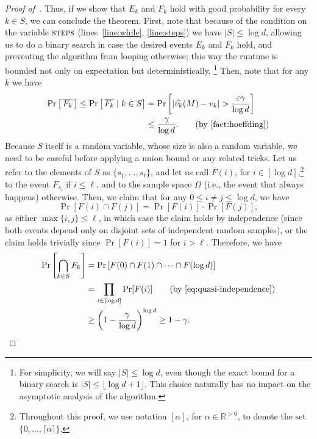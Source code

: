 \begin{proof}[Proof of~]
Thus, if we show that $E_k$ and $F_k$ hold with good probability for every $k \in S$, we can conclude the theorem.
First, note that because of the condition on the variable $\textsc{steps}$ (lines~\ref{line:while}, \ref{line:steps}) we have $|S| \leq \log d$, allowing us to do a binary search in case the desired events $E_k$ and $F_k$ hold, and preventing the algorithm from looping otherwise; this way the runtime is bounded not only on expectation but deterministically. \footnote{For simplicity, we will say $|S| \leq \log d$, even though the exact bound for a binary search is $|S| \leq \lfloor \log d  + 1 \rfloor$. This choice naturally has no impact on the asymptotic analysis of the algorithm.} Then, note that for any $k$ we have
\begin{align*}
	\Pr\left[ \, \overline{F_k} \,\right] \leq \Pr\left[ \, \overline{F_k} \mid k \in S \right] &= \Pr\left[|\widehat{v_k}(M) - v_k| > \frac{\varepsilon \gamma}{\log d}\right]\\
	&\leq \frac{\gamma}{\log d}. \tag{by~\Cref{fact:hoeffding}}
\end{align*}
Because $S$ itself is a random variable, whose size is also a random variable, we need to be careful before applying a union bound or any related tricks. Let us refer to the elements of $S$ as $\{s_1, \ldots, s_\ell\}$, and let us call $F(i)$, for $i \in [\log d]$,\footnote{Throughout this proof, we use notation $[\alpha]$, for $\alpha \in \mathbb{R}^{> 0}$, to denote the set $\{0, \ldots, \lceil \alpha \rceil\}$.} to the event $F_{s_i}$ if $i \leq \ell$, and to the sample space $\Omega$ (i.e., the event that always happens) otherwise. Then, we claim that for any $0 \leq i \neq j \leq \log d$, we have 
\begin{equation}\label{eq:quasi-independence}
	\Pr[F(i) \cap F(j)] = \Pr[F(i)] \cdot \Pr[F(j)],
\end{equation}
as either $\max \{i, j\} \leq \ell$, in which case the claim holds by independence (since both events depend only on disjoint sets of independent random samples), or the claim holds trivially since $\Pr[F(i)] = 1$ for $i > \ell$.
Therefore, we have 
\begin{align*}
\Pr\left[\bigcap_{k \in S} F_k\right] &= \Pr\left[F(0) \cap F(1) \cap \cdots \cap F(\log d)\right]\\
&= \prod_{i \in [\log d]} \Pr[F(i)]\tag{by~\Cref{eq:quasi-independence}}\\
&\geq \left(1 - \frac{\gamma}{\log d}\right)^{\log d} \geq 1 - \gamma.
\end{align*}

\end{proof}
